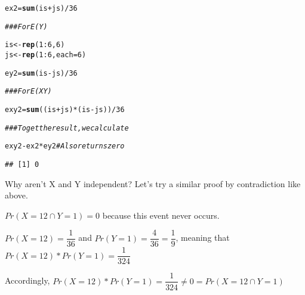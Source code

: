 \documentclass[12pt,letter]{article}\usepackage[]{graphicx}\usepackage[]{color}
\makeatletter
\newcommand{\hlnum}[1]{\textcolor[rgb]{0.686,0.059,0.569}{#1}}%
\newcommand{\hlcom}[1]{\textcolor[rgb]{0.678,0.584,0.686}{\textit{#1}}}%
\newcommand{\hlopt}[1]{\textcolor[rgb]{0,0,0}{#1}}%
\newcommand{\hlstd}[1]{\textcolor[rgb]{0.345,0.345,0.345}{#1}}%
\newcommand{\hlkwb}[1]{\textcolor[rgb]{0.69,0.353,0.396}{#1}}%
\newcommand{\hlkwc}[1]{\textcolor[rgb]{0.333,0.667,0.333}{#1}}%
\newcommand{\hlkwd}[1]{\textcolor[rgb]{0.737,0.353,0.396}{\textbf{#1}}}%
\newenvironment{kframe}{%
 \def\at@end@of@kframe{}%
 \ifinner\ifhmode%
  \def\at@end@of@kframe{\end{minipage}}%
  \begin{minipage}{\columnwidth}%
 \fi\fi%
 \def\FrameCommand##1{\hskip\@totalleftmargin \hskip-\fboxsep
 \colorbox{shadecolor}{##1}\hskip-\fboxsep
     \hskip-\linewidth \hskip-\@totalleftmargin \hskip\columnwidth}%
 \MakeFramed {\advance\hsize-\width
   \@totalleftmargin\z@ \linewidth\hsize
   \@setminipage}}%
 {\par\unskip\endMakeFramed%
 \at@end@of@kframe}
\newenvironment{knitrout}{}{} %
\makeatother
\begin{document}
\begin{knitrout}
\begin{kframe}
\begin{alltt}
\hlstd{ex2} \hlkwb{=} \hlkwd{sum}\hlstd{(is} \hlopt{+} \hlstd{js)}\hlopt{/}\hlnum{36}

\hlcom{### For E(Y)}

\hlstd{is} \hlkwb{<-} \hlkwd{rep}\hlstd{(}\hlnum{1}\hlopt{:}\hlnum{6}\hlstd{,} \hlnum{6}\hlstd{)}
\hlstd{js} \hlkwb{<-} \hlkwd{rep}\hlstd{(}\hlnum{1}\hlopt{:}\hlnum{6}\hlstd{,} \hlkwc{each} \hlstd{=} \hlnum{6}\hlstd{)}

\hlstd{ey2} \hlkwb{=} \hlkwd{sum}\hlstd{(is} \hlopt{-} \hlstd{js)}\hlopt{/}\hlnum{36}

\hlcom{### For E(XY)}

\hlstd{exy2} \hlkwb{=} \hlkwd{sum}\hlstd{((is} \hlopt{+} \hlstd{js)} \hlopt{*} \hlstd{(is} \hlopt{-} \hlstd{js))}\hlopt{/}\hlnum{36}

\hlcom{### To get the result, we calculate}

\hlstd{exy2} \hlopt{-} \hlstd{ex2} \hlopt{*} \hlstd{ey2}  \hlcom{# Also returns zero}
\end{alltt}
\begin{verbatim}
## [1] 0
\end{verbatim}
\end{kframe}
\end{knitrout}

Why aren't X and Y independent? Let's try a similar proof by contradiction like above.

$Pr (X=12 \cap Y=1) = 0$ because this event never occurs.

$Pr (X=12) = \dfrac{1}{36}$ and $Pr (Y=1) = \dfrac{4}{36} = \dfrac{1}{9}$, meaning that $Pr (X=12)*Pr(Y=1) = \dfrac{1}{324}$

Accordingly, $Pr (X=12)*Pr(Y=1) = \dfrac{1}{324} \neq 0 = Pr (X=12 \cap Y=1)$
\end{document}
